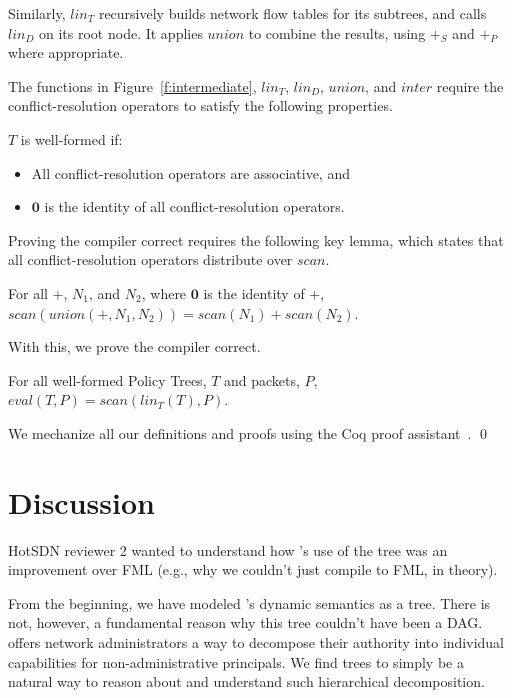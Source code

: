 Similarly, $\mathit{lin}_T$ recursively builds network flow tables for
its subtrees, and calls $\mathit{lin}_D$ on its root node.  It applies
$\mathit{union}$ to combine the results, using $+_S$ and $+_P$ where
appropriate.


The functions in Figure~\ref{f:intermediate}, $\mathit{lin}_T$,
$\mathit{lin}_D$, $\mathit{union}$, and $\mathit{inter}$ require the
conflict-resolution operators to satisfy the following properties.
\begin{wftree} 
$T$ is well-formed if:
\begin{itemize}

\item All conflict-resolution operators are associative, and

\item $\textbf{0}$ is the identity of all conflict-resolution operators.
\end{itemize}
\end{wftree}
Proving the compiler correct requires the following key lemma, which
states that all conflict-resolution operators distribute over $\mathit{scan}$.
\begin{unioncommute}
For all $+$, $N_1$, and $N_2$, where $\textbf{0}$ is the identity of $+$,
$\mathit{scan}(\mathit{union}(+,N_1,N_2)) = \mathit{scan}(N_1) +
\mathit{scan}(N_2)$.
\end{unioncommute}
With this, we prove the compiler correct.
\begin{compilercorrect}[Soundness]
For all well-formed Policy Trees, $T$ and packets, $P$, $\mathit{eval}(T, P) =
\mathit{scan}(\mathit{lin}_T(T), P)$.
\end{compilercorrect}
We mechanize all our definitions and proofs using the Coq proof assistant~\cite{coq}. \qed

\section{Discussion}

{\color{red}
HotSDN reviewer
2 wanted to understand how \sys's use of the tree was an improvement over FML (e.g.,
why we couldn't just compile to FML, in theory).
}

From the beginning, we have modeled \sys's dynamic semantics as a tree.
There is not, however, a fundamental reason why this tree couldn't have been a DAG.
\sys offers network administrators a way to decompose their authority into
individual capabilities for non-administrative principals. We find trees to simply
be a natural way to reason about and understand such hierarchical decomposition.

